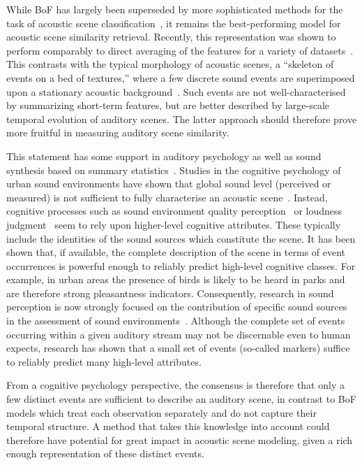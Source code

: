 \documentclass[smallextended]{svjour3}
\begin{document}
While BoF has largely been superseded by more sophisticated methods for the task of acoustic scene classification~\cite{7100934}, it remains the best-performing model for acoustic scene similarity retrieval.
Recently, this representation was shown to perform comparably to direct averaging of the features for a variety of datasets~\cite{lagrange:hal-01082501}.
This contrasts with the typical morphology of acoustic scenes, a ``skeleton of events on a bed of textures,'' where a few discrete sound events are superimposed upon a stationary acoustic background~\cite{nelken2013}.
Such events are not well-characterised by summarizing short-term features, but are better described by large-scale temporal evolution of auditory scenes.
The latter approach should therefore prove more fruitful in measuring auditory scene similarity.

This statement has some support in auditory psychology as well as sound synthesis based on summary statistics~\cite{mcdermott2013summary}. Studies in the cognitive psychology of urban sound environments have shown that global sound level (perceived or measured) is not sufficient to fully characterise an acoustic scene~\cite{guyot2005urban,kang2006urban}. Instead, cognitive processes such as sound environment quality perception~\cite{dubois2006cognitive} or loudness judgment~\cite{kuwano_memory_2003} seem to rely upon higher-level cognitive attributes. These typically include the identities of the sound sources which constitute the scene. It has been shown that, if available, the complete description of the scene in terms of event occurrences is powerful enough to reliably predict high-level cognitive classes. For example, in urban areas the presence of birds is likely to be heard in parks and are therefore strong pleasantness indicators. Consequently, research in sound perception is now strongly focused on the contribution of specific sound sources in the assessment of sound environments~\cite{ricciardi2015sound,lavandier2006contribution}. Although the complete set of events occurring within a given auditory stream may not be discernable even to human expects, research has shown that a small set of events (so-called markers) suffice to reliably predict many high-level attributes.

From a cognitive psychology perspective, the consensus is therefore that only a few distinct events are sufficient to describe an auditory scene, in contrast to BoF models which treat each observation separately and do not capture their temporal structure. A method that takes this knowledge into account could therefore have potential for great impact in acoustic scene modeling, given a rich enough representation of these distinct events.
\end{document}

